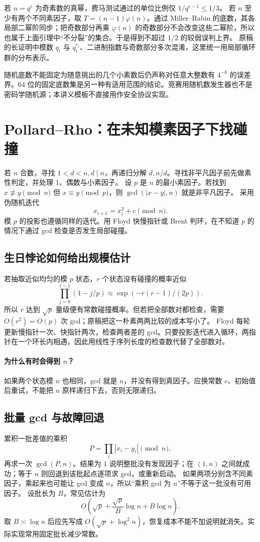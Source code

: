 若 $n=q^e$ 为奇素数的真幂，费马测试通过的单位比例仅 $1/q^{e-1}\le1/3$。
若 $n$ 至少有两个不同素因子，取 $T=(n-1)\varphi(n)$。通过 Miller--Rabin 的底数，其各局部二幂阶同步；把奇数部分再乘 $\varphi(n)$ 的奇数部分不会改变这些二幂阶，所以也属于上面引理中“不分裂”的集合。于是得到不超过 $1/2$ 的较弱误判上界。
原稿的长证明中模数 $q_i$ 与 $q_i^{e_i}$、二进制指数与奇数部分多次混淆，这里统一用局部循环群的分布表示。

\begin{pitfall}[随机结论与安全工程]
随机底数不能固定为随意挑出的几个小素数后仍声称对任意大整数有 $4^{-k}$ 的误差界。$64$ 位的固定底数集是另一种有适用范围的结论。竞赛用随机数发生器也不是密码学随机源；本讲义模板不直接用作安全协议实现。
\end{pitfall}


\section{Pollard--Rho：在未知模素因子下找碰撞}
若 $n$ 合数，寻找 $1<d<n,d\mid n$，再递归分解 $d,n/d$。寻找非平凡因子前先做素性判定，并处理 $1$、偶数与小素因子。
设 $p$ 是 $n$ 的最小素因子。若找到 $x\not\equiv y\pmod n$ 但 $x\equiv y\pmod p$，则 $\gcd(|x-y|,n)$ 就是非平凡因子。
采用伪随机迭代
\[
 x_{i+1}=x_i^2+c\pmod n.
\]
模 $p$ 的投影也遵循同样的迭代。用 Floyd 快慢指针或 Brent 判环，在不知道 $p$ 的情况下通过 gcd 检查是否发生局部碰撞。


\subsection{生日悖论如何给出规模估计}
若抽取近似均匀的模 $p$ 状态，$r$ 个状态没有碰撞的概率近似
\[
 \prod_{j=0}^{r-1}(1-j/p)\approx\exp(-r(r-1)/(2p)).
\]
所以 $r$ 达到 $\sqrt p$ 量级便有常数碰撞概率。但若把全部数对都检查，需要 $O(r^2)=O(p)$ 次 gcd；原稿把这一朴素两两比较的成本写小了。
Floyd 每轮更新慢指针一次、快指针两次，检查两者差的 gcd。只要投影迭代进入循环，两指针在一个环长内相遇，因此用线性于序列长度的检查数代替了全部数对。

\paragraph{为什么有时会得到 $n$？}
如果两个状态模 $n$ 也相同，gcd 就是 $n$，并没有得到真因子。应换常数 $c$、初始值后重试，不能把 $n$ 原样递归下去，否则无限递归。

\subsection{批量 gcd 与故障回退}
累积一批差值的乘积
\[
 P=\prod_i|x_i-y_i|\pmod n,
\]
再求一次 $\gcd(P,n)$。结果为 $1$ 说明整批没有发现因子；在 $(1,n)$ 之间就成功；等于 $n$ 则回退到该批起点逐项求 gcd，或重新启动。
如果两项分别含不同素因子，乘起来也可能让 gcd 变成 $n$，所以“乘积 gcd 为 $n$”不等于这一批没有可用因子。
设批长为 $B$，常见估计为
\[
 O\left(\sqrt p+\frac{\sqrt p}{B}\log n+B\log n\right).
\]
取 $B\asymp\log n$ 后应先写成 $O(\sqrt p+\log^2n)$，恢复成本不能不加说明就消失。实际实现常用固定批长减少常数。

